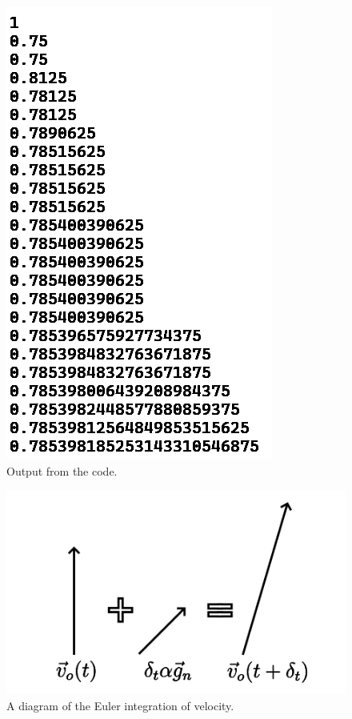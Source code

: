 \documentclass[12pt]{article}
\begin{document}
\begin{figure} 
\centering
\label{fig7}
  \includegraphics[width = 4 in]{code_output.png}
  \caption{
Output from the code.
}
\end{figure}







\begin{figure} 
\centering
\label{fig7}
  \includegraphics[width = 6 in]{velocity.png}
  \caption{
A diagram of the Euler integration of velocity.
}
\end{figure}
\end{document}
